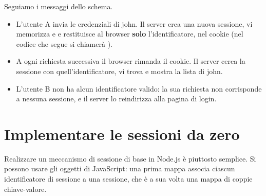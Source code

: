 Seguiamo i messaggi dello schema.
\begin{itemize}[leftmargin=2.6em, labelwidth=2em, labelsep=0.6em, align=left]
  \item[\textbf{1-2}] L'utente A invia le credenziali di john. Il server crea
        una nuova sessione, vi memorizza  e  e
        restituisce al browser \textbf{solo} l'identificatore, nel cookie
         (nel codice che segue si chiamerà ).
  \item[\textbf{3-4}] A ogni richiesta successiva il browser rimanda il cookie.
        Il server cerca la sessione con quell'identificatore, vi trova
         e mostra la lista di john.
  \item[\textbf{5-6}] L'utente B non ha alcun identificatore valido: la sua
        richiesta non corrisponde a nessuna sessione, e il server lo
        reindirizza alla pagina di login.
\end{itemize}

\section{Implementare le sessioni da zero}

Realizzare un meccanismo di sessione di base in Node.js è piuttosto semplice.
Si possono usare gli oggetti  di JavaScript: una prima mappa associa
ciascun identificatore di sessione a una sessione, che è a sua volta una mappa
di coppie chiave-valore.

